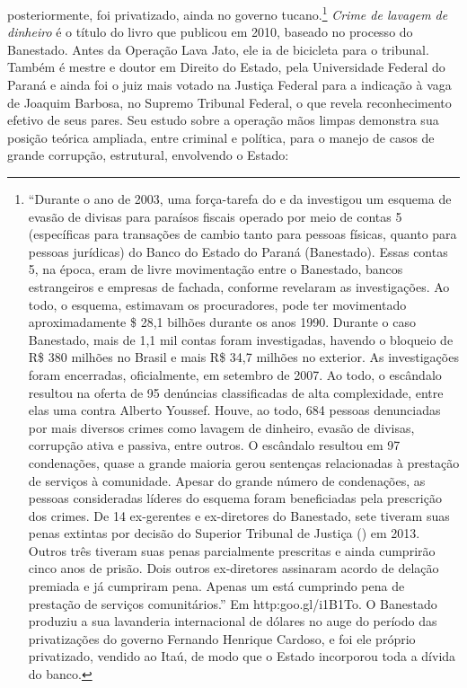 posteriormente, foi privatizado, ainda no governo tucano.\footnote{``Durante
  o ano de 2003, uma força-tarefa do  e da  investigou um esquema
  de evasão de divisas para paraísos fiscais operado por meio de contas
  5 (específicas para transações de cambio tanto para pessoas físicas,
  quanto para pessoas jurídicas) do Banco do Estado do Paraná
  (Banestado). Essas contas 5, na época, eram de livre movimentação
  entre o Banestado, bancos estrangeiros e empresas de fachada, conforme
  revelaram as investigações. Ao todo, o esquema, estimavam os
  procuradores, pode ter movimentado aproximadamente \$ 28,1 bilhões
  durante os anos 1990. Durante o caso Banestado, mais de 1,1 mil contas
  foram investigadas, havendo o bloqueio de R\$ 380 milhões no Brasil e
  mais R\$ 34,7 milhões no exterior. As investigações foram encerradas,
  oficialmente, em setembro de 2007. Ao todo, o escândalo resultou na
  oferta de 95 denúncias classificadas de alta complexidade, entre elas
  uma contra Alberto Youssef. Houve, ao todo, 684 pessoas denunciadas por
  mais diversos crimes como lavagem de dinheiro, evasão de divisas,
  corrupção ativa e passiva, entre outros. O escândalo resultou em 97
  condenações, quase a grande maioria gerou sentenças relacionadas à
  prestação de serviços à comunidade. Apesar do grande número de
  condenações, as pessoas consideradas líderes do esquema foram
  beneficiadas pela prescrição dos crimes. De 14 ex-gerentes e
  ex-diretores do Banestado, sete tiveram suas penas extintas por
  decisão do Superior Tribunal de Justiça () em 2013. Outros três
  tiveram suas penas parcialmente prescritas e ainda cumprirão cinco
  anos de prisão. Dois outros ex-diretores assinaram acordo de delação
  premiada e já cumpriram pena. Apenas um está cumprindo pena de
  prestação de serviços comunitários.'' Em
  http:goo.gl/i1B1To.
  O Banestado produziu a sua lavanderia internacional de dólares no auge
  do período das privatizações do governo Fernando Henrique Cardoso, e
  foi ele próprio privatizado, vendido ao Itaú, de modo que o Estado
  incorporou toda a dívida do banco.} \emph{Crime de lavagem de
dinheiro} é o título do livro que publicou em 2010, baseado no processo
do Banestado. Antes da Operação Lava Jato, ele ia de bicicleta para o
tribunal. Também é mestre e doutor em Direito do Estado, pela
Universidade Federal do Paraná e ainda foi o juiz mais votado na Justiça
Federal para a indicação à vaga de Joaquim Barbosa, no Supremo Tribunal Federal,
o que revela reconhecimento efetivo de seus pares. Seu estudo sobre a operação
mãos limpas demonstra sua posição teórica ampliada, entre criminal e política,
para o manejo de casos de grande corrupção, estrutural, envolvendo o Estado:

